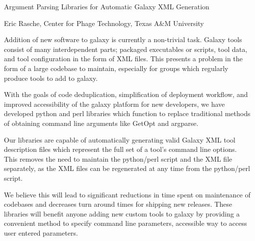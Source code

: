 Argument Parsing Libraries for Automatic Galaxy XML Generation

Eric Rasche, Center for Phage Technology, Texas A\&M University


Addition of new software to galaxy is currently a non-trivial task.
Galaxy tools consist of many interdependent parts; packaged
executables or scripts, tool data, and tool configuration in the form
of XML files. This presents a problem in the form of a large codebase
to maintain, especially for groups which regularly produce tools to
add to galaxy.

With the goals of code deduplication, simplification of deployment
workflow, and improved accessibility of the galaxy platform for new
developers, we have developed python and perl libraries which function
to replace traditional methods of obtaining command line arguments
like GetOpt and argparse.

Our libraries are capable of automatically generating valid Galaxy XML
tool description files which represent the full set of a tool's
command line options. This removes the need to maintain the
python/perl script and the XML file separately, as the XML files can
be regenerated at any time from the python/perl script.

We believe this will lead to significant reductions in time spent on
maintenance of codebases and decreases turn around times for shipping
new releases. These libraries will benefit anyone adding new custom
tools to galaxy by providing a convenient method to specify command
line parameters, accessible way to access user entered parameters.

